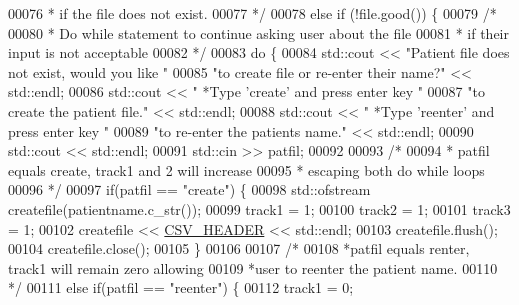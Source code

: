 \begin{DoxyCode}
00076 \textcolor{comment}{             * if the file does not exist.}
00077 \textcolor{comment}{             */}
00078             \textcolor{keywordflow}{else} \textcolor{keywordflow}{if} (!file.good()) \{
00079                 \textcolor{comment}{/* }
00080 \textcolor{comment}{                 * Do while statement to continue asking user about the file}
00081 \textcolor{comment}{                 * if their input is not acceptable}
00082 \textcolor{comment}{                 */} 
00083                 \textcolor{keywordflow}{do} \{
00084                     std::cout << \textcolor{stringliteral}{"Patient file does not exist, would you like "}
00085                         \textcolor{stringliteral}{"to create file or re-enter their name?"} << std::endl;
00086                     std::cout << \textcolor{stringliteral}{"  *Type 'create' and press enter key "}
00087                         \textcolor{stringliteral}{"to create the patient file."} << std::endl;
00088                     std::cout << \textcolor{stringliteral}{"  *Type 'reenter' and press enter key "}
00089                         \textcolor{stringliteral}{"to re-enter the patients name."} << std::endl;
00090                     std::cout << std::endl;
00091                     std::cin >> patfil;
00092 
00093                     \textcolor{comment}{/* }
00094 \textcolor{comment}{                     * patfil equals create, track1 and 2 will increase}
00095 \textcolor{comment}{                     * escaping both do while loops}
00096 \textcolor{comment}{                     */}
00097                     \textcolor{keywordflow}{if}(patfil == \textcolor{stringliteral}{"create"}) \{
00098                         std::ofstream createfile(patientname.c\_str());
00099                         track1 = 1;
00100                         track2 = 1;
00101                         track3 = 1;
00102                         createfile << \hyperlink{namespaceavda_ac568a0872c2c176d874b8b12f67f43ea}{CSV\_HEADER} << std::endl;
00103                         createfile.flush();
00104                         createfile.close();
00105                     \}
00106 
00107                     \textcolor{comment}{/*}
00108 \textcolor{comment}{                     *patfil equals renter, track1 will remain zero allowing}
00109 \textcolor{comment}{                     *user to reenter the patient name.}
00110 \textcolor{comment}{                     */}
00111                     \textcolor{keywordflow}{else} \textcolor{keywordflow}{if}(patfil == \textcolor{stringliteral}{"reenter"}) \{
00112                         track1 = 0;

\end{DoxyCode}
